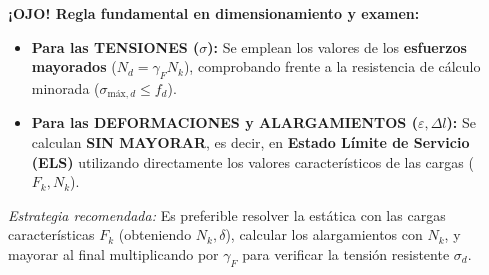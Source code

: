 \begin{ImportanteBox}[title={Advertencia Crítica: Mayoración de Cargas vs. Cálculo de Deformaciones}]
    \textbf{¡OJO! Regla fundamental en dimensionamiento y examen:}
    \begin{itemize}
        \item \textbf{Para las TENSIONES ($\sigma$):} Se emplean los valores de los \textbf{esfuerzos mayorados} ($N_d = \gamma_F N_k$), comprobando frente a la resistencia de cálculo minorada ($\sigma_{\text{máx},d} \le f_d$).
        \item \textbf{Para las DEFORMACIONES y ALARGAMIENTOS ($\varepsilon, \Delta l$):} Se calculan \textbf{SIN MAYORAR}, es decir, en \textbf{Estado Límite de Servicio (ELS)} utilizando directamente los valores característicos de las cargas ($F_k, N_k$).
    \end{itemize}
    \textit{Estrategia recomendada:} Es preferible resolver la estática con las cargas características $F_k$ (obteniendo $N_k, \delta$), calcular los alargamientos con $N_k$, y mayorar al final multiplicando por $\gamma_F$ para verificar la tensión resistente $\sigma_d$.
\end{ImportanteBox}

